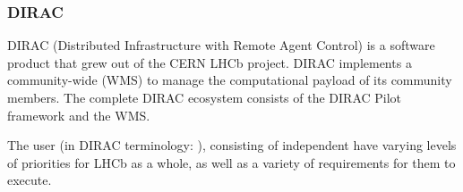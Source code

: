 \documentclass{sig-alternate}
\begin{document}



\subsubsection{DIRAC}

DIRAC (Distributed Infrastructure with Remote Agent Control) is a software
product that grew out of the CERN LHCb project\cite{diracgrid2004}.
DIRAC implements a community-wide (WMS) to
manage the computational payload of its community members.
The complete DIRAC ecosystem consists of the DIRAC Pilot framework and the WMS.



The user  (in DIRAC terminology: ),
consisting of independent   have varying levels of priorities for
LHCb as a whole, as well as a variety of requirements for them to execute.
\end{document}
